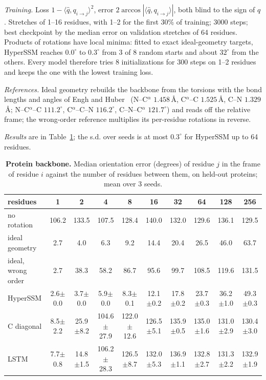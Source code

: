 \documentclass[aps,prx,reprint,superscriptaddress,longbibliography,nofootinbib,floatfix]{revtex4-2}
\theoremstyle{plain}
\theoremstyle{definition}
\begin{document}
\emph{Training.} Loss $1-\langle\hat q,q_{i\to j}\rangle^2$, error
$2\arccos|\langle\hat q,q_{i\to j}\rangle|$, both blind to the sign of $q$.
Stretches of 1--16 residues, with 1--2 for the first 30\% of training; 3000
steps; best checkpoint by the median error on validation stretches of 64
residues. Products of rotations have local minima: fitted to exact
ideal-geometry targets, HyperSSM reaches $0.0^\circ$ to $0.3^\circ$ from 3 of 8
random starts and about $32^\circ$ from the others. Every model therefore
tries 8 initializations for 300 steps on 1--2 residues and keeps the one
with the lowest training loss.

\emph{References.} Ideal geometry rebuilds the backbone from the
torsions with the bond lengths and angles of Engh and Huber~\cite{engh_huber}
(N--C$^\alpha$ $1.458$\,\AA, C$^\alpha$--C $1.525$\,\AA, C--N $1.329$\,\AA;
N--C$^\alpha$--C $111.2^\circ$, C$^\alpha$--C--N $116.2^\circ$, C--N--C$^\alpha$
$121.7^\circ$) and reads off the relative frame; the wrong-order reference
multiplies its per-residue rotations in reverse.

\emph{Results} are in Table~\ref{tab:protein}; the s.d. over
seeds is at most $0.3^\circ$ for HyperSSM up to 64 residues.

\begin{table}[!htb]
\caption{\label{tab:protein}\textbf{Protein backbone.} Median
orientation error (degrees) of residue $j$ in the frame of residue $i$ against
the number of residues between them, on held-out proteins; mean over 3 seeds.}
\centering
\small
\begin{tabular}{lccccccccc}
residues & 1 & 2 & 4 & 8 & 16 & 32 & 64 & 128 & 256\\
\hline

no rotation        & 106.2 & 133.5 & 107.5 & 128.4 & 140.0 & 132.0 & 129.6 & 136.1 & 129.5 \\
ideal geometry     & 2.7 & 4.0 & 6.3 & 9.2 & 14.4 & 20.4 & 26.5 & 46.0 & 63.7 \\
ideal, wrong order & 2.7 & 38.3 & 58.2 & 86.7 & 95.6 & 99.7 & 108.5 & 119.6 & 131.5 \\
HyperSSM   & 2.6$\pm$0.0 & 3.7$\pm$0.0 & 5.9$\pm$0.0 & 8.3$\pm$0.1 & 12.1$\pm$0.2 & 17.8$\pm$0.2 & 23.7$\pm$0.3 & 36.2$\pm$1.0 & 49.3$\pm$0.3 \\
C diagonal & 8.5$\pm$2.2 & 25.9$\pm$8.2 & 104.6$\pm$27.9 & 122.0$\pm$12.6 & 126.5$\pm$5.1 & 135.9$\pm$0.5 & 135.0$\pm$1.6 & 131.0$\pm$2.9 & 130.4$\pm$3.0 \\
LSTM       & 7.7$\pm$0.8 & 14.8$\pm$1.5 & 106.2$\pm$28.3 & 126.5$\pm$8.7 & 132.0$\pm$5.3 & 136.9$\pm$1.1 & 132.8$\pm$2.7 & 131.3$\pm$2.2 & 132.9$\pm$1.9 \\
\end{tabular}
\end{table}
\end{document}
